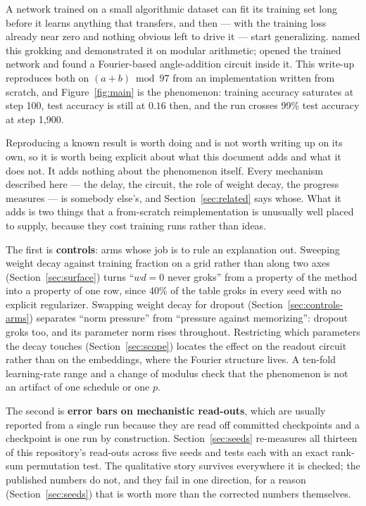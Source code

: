 \documentclass[11pt]{article}
\begin{document}
A network trained on a small algorithmic dataset can fit its training set long
before it learns anything that transfers, and then --- with the training loss
already near zero and nothing obvious left to drive it --- start generalizing.
\citet{power2022grokking} named this grokking and demonstrated it on modular
arithmetic; \citet{nanda2023progress} opened the trained network and found a
Fourier-based angle-addition circuit inside it. This write-up reproduces both
on $(a + b) \bmod 97$ from an implementation written from scratch, and
Figure~\ref{fig:main} is the phenomenon: training accuracy saturates at step
100, test accuracy is still at $0.16$ then, and the run crosses 99\% test
accuracy at step 1{,}900.

Reproducing a known result is worth doing and is not worth writing up on its
own, so it is worth being explicit about what this document adds and what it
does not. It adds nothing about the phenomenon itself. Every mechanism
described here --- the delay, the circuit, the role of weight decay, the
progress measures --- is somebody else's, and Section~\ref{sec:related} says
whose. What it adds is two things that a from-scratch reimplementation is
unusually well placed to supply, because they cost training runs rather than
ideas.

The first is \textbf{controls}: arms whose job is to rule an explanation out.
Sweeping weight decay against training fraction on a grid rather than along two
axes (Section~\ref{sec:surface}) turns ``$wd = 0$ never groks'' from a property
of the method into a property of one row, since 40\% of the table groks in
every seed with no explicit regularizer. Swapping weight decay for dropout
(Section~\ref{sec:controls-arms}) separates ``norm pressure'' from ``pressure
against memorizing'': dropout groks too, and its parameter norm rises
throughout. Restricting which parameters the decay touches
(Section~\ref{sec:scope}) locates the effect on the readout circuit rather than
on the embeddings, where the Fourier structure lives. A ten-fold learning-rate
range and a change of modulus check that the phenomenon is not an artifact of
one schedule or one $p$.

The second is \textbf{error bars on mechanistic read-outs}, which are usually
reported from a single run because they are read off committed checkpoints and
a checkpoint is one run by construction. Section~\ref{sec:seeds} re-measures
all thirteen of this repository's read-outs across five seeds and tests each
with an exact rank-sum permutation test. The qualitative story survives
everywhere it is checked; the published numbers do not, and they fail in one
direction, for a reason (Section~\ref{sec:seeds}) that is worth more than the
corrected numbers themselves.
\end{document}
